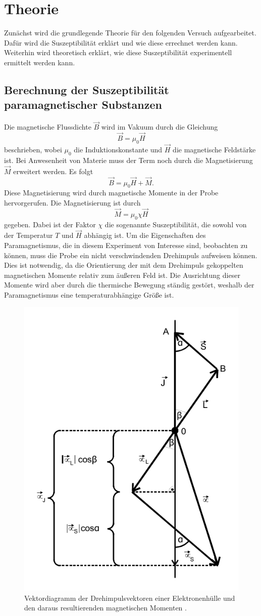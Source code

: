 \section{Theorie}
\label{sec:Theorie}

Zunächst wird die grundlegende Theorie für den folgenden Versuch aufgearbeitet.
Dafür wird die Suszeptibilität erklärt und wie diese errechnet werden kann.
Weiterhin wird theoretisch erklärt, wie diese Suszeptibilität experimentell ermittelt werden kann.

\subsection{Berechnung der Suszeptibilität paramagnetischer Substanzen}

Die magnetische Flussdichte $\vec{B}$ wird im Vakuum durch die Gleichung
\begin{equation*}
    \vec{B} = \mu_0 \vec{H}
\end{equation*}
beschrieben, wobei $\mu_0$ die Induktionskonstante und $\vec{H}$ die magnetische Feldstärke ist.
Bei Anwesenheit von Materie muss der Term noch durch die Magnetisierung $\vec{M}$ erweitert werden.
Es folgt
\begin{equation}
    \vec{B} = \mu_0 \vec{H} + \vec{M}.
\end{equation}
Diese Magnetisierung wird durch magnetische Momente in der Probe hervorgerufen.
Die Magnetisierung ist durch
\begin{equation*}
    \vec{M} = \mu_0 \chi \vec{H}
\end{equation*}
gegeben.
Dabei ist der Faktor $\chi$ die sogenannte Suszeptibilität, die sowohl von der Temperatur $T$ und $\vec{H}$ abhängig ist.
Um die Eigenschaften des Paramagnetismus, die in diesem Experiment von Interesse sind, beobachten zu können, muss die Probe ein nicht
verschwindenden Drehimpuls aufweisen können.
Dies ist notwendig, da die Orientierung der mit dem Drehimpuls gekoppelten magnetischen Momente relativ zum äußeren Feld ist.
Die Ausrichtung dieser Momente wird aber durch die thermische Bewegung ständig gestört, weshalb der Paramagnetismus eine temperaturabhängige Größe ist.
\begin{figure}
    \centering
    \includegraphics[width= 0.4 \linewidth]{pictures/Zeichnung1.pdf}
    \caption{Vektordiagramm der Drehimpulsvektoren einer Elektronenhülle und den daraus resultierenden magnetischen Momenten \cite{v606}.}
    \label{fig:Zeichnung1}
\end{figure}

